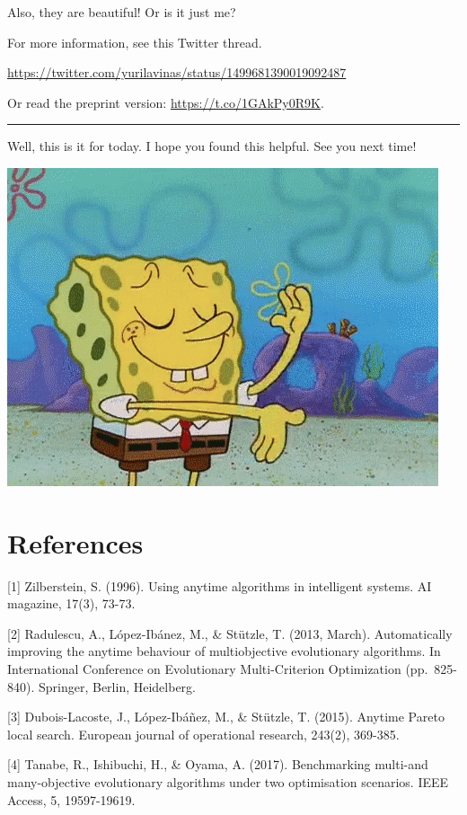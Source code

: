 \documentclass[
]{article}
\begin{document}
Also, they are beautiful! Or is it just me?

For more information, see this Twitter thread.

\url{https://twitter.com/yurilavinas/status/1499681390019092487}

Or read the preprint version: \url{https://t.co/1GAkPy0R9K}.

\begin{center}\rule{0.5\linewidth}{0.5pt}\end{center}

Well, this is it for today. I hope you found this helpful. See you next
time!

\includegraphics{gifs/spongebob-done.gif}

\hypertarget{references}{%
\section{References}\label{references}}

{[}1{]} Zilberstein, S. (1996). Using anytime algorithms in intelligent
systems. AI magazine, 17(3), 73-73.

{[}2{]} Radulescu, A., López-Ibánez, M., \& Stützle, T. (2013, March).
Automatically improving the anytime behaviour of multiobjective
evolutionary algorithms. In International Conference on Evolutionary
Multi-Criterion Optimization (pp.~825-840). Springer, Berlin,
Heidelberg.

{[}3{]} Dubois-Lacoste, J., López-Ibáñez, M., \& Stützle, T. (2015).
Anytime Pareto local search. European journal of operational research,
243(2), 369-385.

{[}4{]} Tanabe, R., Ishibuchi, H., \& Oyama, A. (2017). Benchmarking
multi-and many-objective evolutionary algorithms under two optimisation
scenarios. IEEE Access, 5, 19597-19619.
\end{document}
